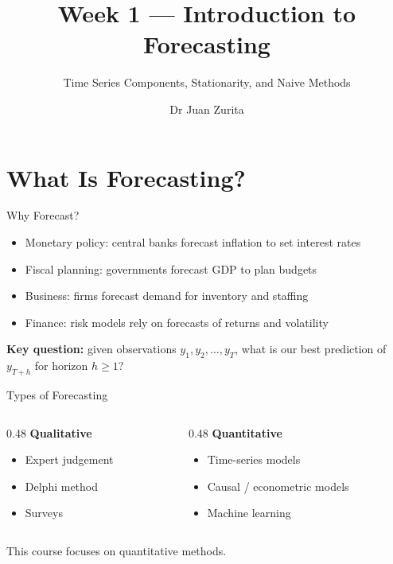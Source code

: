 \documentclass[aspectratio=169, 10pt]{beamer}
\title{Week 1 --- Introduction to Forecasting}
\subtitle{Time Series Components, Stationarity, and Naive Methods}
\author{Dr Juan Zurita}
\institute{Economic \& Business Forecasting\\
The University of Edinburgh~$\cdot$~School of Economics}
\date{}
\begin{document}
\maketitle


\section{What Is Forecasting?}

\begin{frame}{Why Forecast?}
\begin{itemize}
    \item \alert{Monetary policy}: central banks forecast inflation to set interest rates
    \item \alert{Fiscal planning}: governments forecast GDP to plan budgets
    \item \alert{Business}: firms forecast demand for inventory and staffing
    \item \alert{Finance}: risk models rely on forecasts of returns and volatility
\end{itemize}

\vspace{0.5em}
\textbf{Key question:} given observations $y_1, y_2, \ldots, y_T$, what is our best prediction of $y_{T+h}$ for horizon $h \geq 1$?
\end{frame}

\begin{frame}{Types of Forecasting}
\begin{columns}[T]
\begin{column}{0.48\textwidth}
\textbf{Qualitative}
\begin{itemize}
    \item Expert judgement
    \item Delphi method
    \item Surveys
\end{itemize}
\end{column}
\begin{column}{0.48\textwidth}
\textbf{Quantitative}
\begin{itemize}
    \item Time-series models
    \item Causal / econometric models
    \item Machine learning
\end{itemize}
\end{column}
\end{columns}
\vspace{1em}
This course focuses on \alert{quantitative methods}.
\end{frame}
\end{document}
